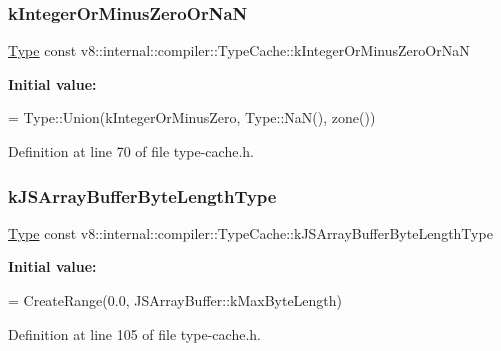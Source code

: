 \subsubsection{\texorpdfstring{k\+Integer\+Or\+Minus\+Zero\+Or\+NaN}{kIntegerOrMinusZeroOrNaN}}
{\footnotesize\ttfamily \mbox{\hyperlink{classv8_1_1internal_1_1compiler_1_1Type}{Type}} const v8\+::internal\+::compiler\+::\+Type\+Cache\+::k\+Integer\+Or\+Minus\+Zero\+Or\+NaN}

{\bfseries Initial value\+:}
\begin{DoxyCode}
=
      Type::Union(kIntegerOrMinusZero, Type::NaN(), zone())
\end{DoxyCode}


Definition at line 70 of file type-\/cache.\+h.

\mbox{\label{classv8_1_1internal_1_1compiler_1_1TypeCache_ade123de40c1842bc27fc82140c9a83d3}} 
\subsubsection{\texorpdfstring{k\+J\+S\+Array\+Buffer\+Byte\+Length\+Type}{kJSArrayBufferByteLengthType}}
{\footnotesize\ttfamily \mbox{\hyperlink{classv8_1_1internal_1_1compiler_1_1Type}{Type}} const v8\+::internal\+::compiler\+::\+Type\+Cache\+::k\+J\+S\+Array\+Buffer\+Byte\+Length\+Type}

{\bfseries Initial value\+:}
\begin{DoxyCode}
=
      CreateRange(0.0, JSArrayBuffer::kMaxByteLength)
\end{DoxyCode}


Definition at line 105 of file type-\/cache.\+h.

\mbox{\label{classv8_1_1internal_1_1compiler_1_1TypeCache_aac02a5f25e7accac89a03af8ab5d17a3}} 
